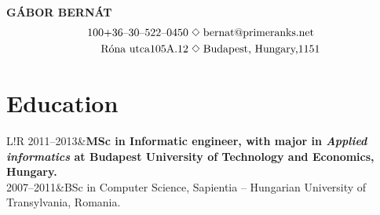 \documentclass[10pt]{article}
\newcommand\VRule{\color{lightgray}\vrule width 0.5pt}
\begin{document}
\begin{minipage}{0.65\textwidth}
\begingroup
\let\center\flushleft
\textbf{\Huge{\MakeUppercase{Gábor Bernát}}}\\
\begin{alignat*}{100}
\mbox{+}36\mbox{--}30\mbox{--}522\mbox{--}0450 \mbox{\hspace{0.1cm}} &\Diamond \mbox{\hspace{0.1cm}bernat@primeranks.net} \\
\mbox{Róna utca} 105\mbox{A}. 12               \mbox{\hspace{0.1cm}} &\Diamond \mbox{\hspace{0.1cm}Budapest, Hungary,} 1151  
\end{alignat*}
\endgroup
\end{minipage}
\begin{minipage}{0.25\textwidth}
\end{minipage}

\section*{Education}
\begin{tabular}{L!{\VRule}R}
2011--2013&{\bf MSc in Informatic engineer, with major in \emph{Applied informatics} at Budapest University of Technology and Economics, Hungary.}\\[5pt]
2007--2011&BSc in Computer Science, Sapientia -- Hungarian University of Transylvania, Romania.\\
\end{tabular}
\end{document}
